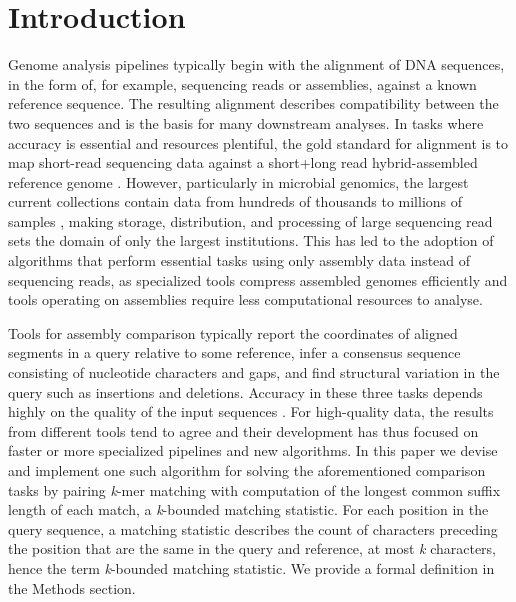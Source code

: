 \documentclass[unnumsec,webpdf,contemporary,large]{oup-authoring-template}%
\theoremstyle{thmstyleone}%
\theoremstyle{thmstyletwo}%
\theoremstyle{thmstylethree}%
\begin{document}

\maketitle


\section{Introduction}
Genome analysis pipelines typically begin with the alignment of DNA sequences, in the form of, for example, sequencing reads or assemblies, against a known reference sequence. The resulting alignment describes compatibility between the two sequences and is the basis for many downstream analyses. In tasks where accuracy is essential and resources plentiful, the gold standard for alignment is to map short-read sequencing data against a short+long read hybrid-assembled reference genome \cite{wick2023assembling}. However, particularly in microbial genomics, the largest current collections contain data from hundreds of thousands to millions of samples \cite{parks2020complete,richardson2023mgnify,hunt2024allthebacteria}, making storage, distribution, and processing of large sequencing read sets the domain of only the largest institutions. This has led to the adoption of algorithms that perform essential tasks using only assembly data instead of sequencing reads, as specialized tools compress assembled genomes efficiently \cite{deorowicz2023agc,bvrinda2024efficient} and tools operating on assemblies require less computational resources to analyse.

Tools for assembly comparison typically report the coordinates of aligned segments in a query relative to some reference, infer a consensus sequence consisting of nucleotide characters and gaps, and find structural variation in the query such as insertions and deletions. Accuracy in these three tasks depends highly on the quality of the input sequences \cite{wick2025reads}. For high-quality data, the results from different tools tend to agree and their development has thus focused on faster or more specialized pipelines and new algorithms. In this paper we devise and implement one such algorithm for solving the aforementioned comparison tasks by pairing \emph{k}-mer matching with computation of the longest common suffix length of each match, a \emph{k}-bounded matching statistic. For each position in the query sequence, a matching statistic describes the count of characters preceding the position that are the same in the query and reference, at most \emph{k} characters, hence the term \emph{k}-bounded matching statistic. We provide a formal definition in the Methods section.
\end{document}
